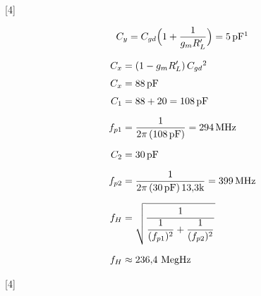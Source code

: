 \documentclass[11pt,a4paper]{article}
\begin{document}
[4]

\[
  C_y = C_{gd}\Bigl(1+\frac{1}{g_m R_L'}\Bigr) = 5\,\mathrm{pF}\footnotemark
\]

\begin{align*}
  C_x &= (1 - g_m R_L')\,C_{gd}\footnotemark \\[3pt]
  C_x &= 88\,\mathrm{pF} \\[3pt]
  C_1 &= 88 + 20 = 108\,\mathrm{pF} \\[6pt]
  f_{p1} &= \frac{1}{2\pi\,(108\,\mathrm{pF})} = 294\,\mathrm{MHz} \\[6pt]
  C_2 &= 30\,\mathrm{pF} \\[6pt]
  f_{p2} &= \frac{1}{2\pi\,(30\,\mathrm{pF})\,13{,}3\mathrm{k}} = 399\,\mathrm{MHz} \\[6pt]
  f_H &= \sqrt{\dfrac{1}{\dfrac{1}{(f_{p1})^2}+\dfrac{1}{(f_{p2})^2}}} \\[6pt]
  f_H &\approx 236{,}4\ \mathrm{MegHz}
\end{align*}

[4]
\end{document}
